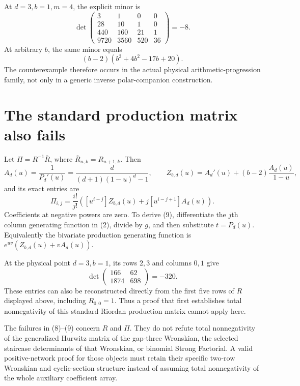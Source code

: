 \documentclass[11pt]{article}
\begin{document}
At $d=3,b=1,m=4$, the explicit minor is
\[
 \det\begin{pmatrix}
 3&1&0&0\\28&10&1&0\\440&160&21&1\\9720&3560&520&36
 \end{pmatrix}=-8.
\]
At arbitrary $b$, the same minor equals
\[
 (b-2)(b^3+4b^2-17b+20).
\]
The counterexample therefore occurs in the actual physical
arithmetic-progression family, not only in a generic inverse
polar-companion construction.

\section{The standard production matrix also fails}
Let $\Pi=R^{-1}\overline R$, where
$\overline R_{n,k}=R_{n+1,k}$. Then
\[
 A_d(u)=\frac1{P_d'(u)}=
       \frac d{(d+1)(1-u)^d-1},\qquad
 Z_{b,d}(u)=A_d'(u)+(b-2)\frac{A_d(u)}{1-u},
\]
and its exact entries are
\[
 \Pi_{i,j}=\frac{i!}{j!}
 \left([u^{i-j}]Z_{b,d}(u)+j[u^{i-j+1}]A_d(u)\right).       \tag{9}
\]
Coefficients at negative powers are zero. To derive (9), differentiate
the $j$th column generating function in (2), divide by $g$, and then
substitute $t=P_d(u)$. Equivalently the bivariate production generating
function is $e^{uv}(Z_{b,d}(u)+vA_d(u))$.

At the physical point $d=3,b=1$, its rows $2,3$ and columns $0,1$ give
\[
 \det\begin{pmatrix}166&62\\1874&698\end{pmatrix}=-320.
\]
These entries can also be reconstructed directly from the first five
rows of $R$ displayed above, including $R_{0,0}=1$.
Thus a proof that first establishes total nonnegativity of this
standard Riordan production matrix cannot apply here.

The failures in (8)--(9) concern $R$ and $\Pi$.
They do not refute total nonnegativity of the generalized Hurwitz matrix
of the gap-three Wronskian, the selected staircase determinants of that
Wronskian, or binomial Strong Factorial.
A valid positive-network proof for those objects must retain their
specific two-row Wronskian and cyclic-section structure instead of
assuming total nonnegativity of the whole auxiliary coefficient array.
\end{document}

